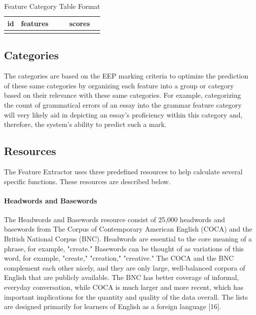 \begin{table}[h]
\centering
\begin{tabular}{@{}|l|lllllll|lllll|@{}}
\toprule
id &
  \multicolumn{7}{l|}{features} &
  \multicolumn{5}{l|}{scores} \\ \midrule
 &
  \multicolumn{1}{l|}{} &
  \multicolumn{1}{l|}{} &
  \multicolumn{1}{l|}{} &
  \multicolumn{1}{l|}{} &
  \multicolumn{1}{l|}{} &
  \multicolumn{1}{l|}{} &
   &
  \multicolumn{1}{l|}{} &
  \multicolumn{1}{l|}{} &
  \multicolumn{1}{l|}{} &
  \multicolumn{1}{l|}{} &
   \\ \bottomrule
\end{tabular}
\caption{Feature Category Table Format}
\label{tab:3}
\end{table}

\subsection{Categories}
The categories are based on the EEP marking criteria to optimize the prediction of these same categories by organizing each feature into a group or category based on their relevance with these same categories. For example, categorizing the count of grammatical errors of an essay into the grammar feature category will very likely aid in depicting an essay's proficiency within this category and, therefore, the system's ability to predict such a mark. 

\subsection{Resources}
The Feature Extractor uses three predefined resources to help calculate several specific functions. These resources are described below.

\paragraph{Headwords and Basewords} The Headwords and Basewords resource consist of 25,000 headwords and basewords from The Corpus of Contemporary American English (COCA) and the British National Corpus (BNC). Headwords are essential to the core meaning of a phrase, for example, "create." Basewords can be thought of as variations of this word, for example, "create," "creation," "creative." The COCA and the BNC complement each other nicely, and they are only large, well-balanced corpora of English that are publicly available. The BNC has better coverage of informal, everyday conversation, while COCA is much larger and more recent, which has important implications for the quantity and quality of the data overall. The lists are designed primarily for learners of English as a foreign language [16]. 

